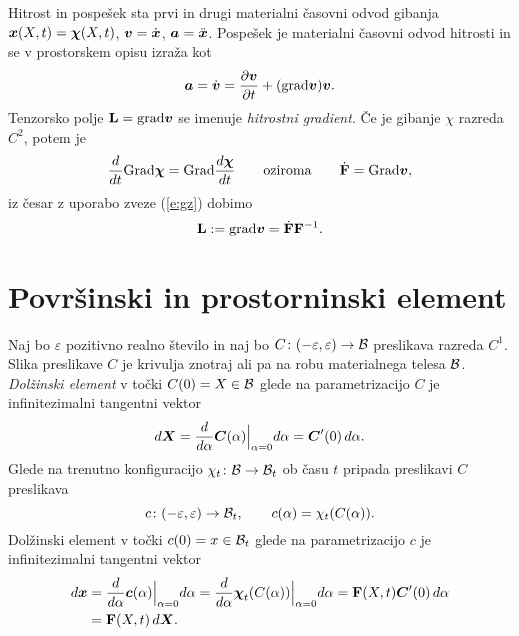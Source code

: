 \begin{primer} %
	Hitrost in pospešek sta prvi in drugi materialni časovni odvod gibanja $\boldsymbol x(X,t)=\boldsymbol \chi(X,t)$,
	$\boldsymbol v=\dot{\boldsymbol x}$, $\boldsymbol a=\ddot{\boldsymbol x}$.
	Pospešek je materialni časovni odvod hitrosti in se v prostorskem opisu izraža kot
	\[ \boldsymbol a=\dot{\boldsymbol v}=\frac{\partial\boldsymbol v}{\partial t}+(\mathrm{grad}\boldsymbol v)\boldsymbol v. \]
	Tenzorsko polje $\mathbf L=\mathrm{grad}\boldsymbol v$ se imenuje \emph{hitrostni gradient}.
	Če je gibanje $\chi$ razreda $C^2$, potem je
	\[
		\frac{d}{dt}\mathrm{Grad}\boldsymbol \chi=\mathrm{Grad}\frac{d\boldsymbol \chi}{dt}\qquad\textrm{oziroma}\qquad
		\dot{\mathbf F}=\mathrm{Grad}\boldsymbol v,
	\]
	iz česar z uporabo zveze (\ref{e:gz}) dobimo
	\begin{equation} \label{e:L}
		\mathbf L:=\mathrm{grad}\boldsymbol v=\dot{\mathbf F}\mathbf F^{-1}.
	\end{equation}
\end{primer}


\section{Površinski in prostorninski element}


Naj bo $\varepsilon$ pozitivno realno število in naj bo $C\colon(-\varepsilon,\varepsilon)\to\mathcal B$
preslikava razreda $C^1$. Slika preslikave $C$ je krivulja znotraj ali pa na robu
materialnega telesa $\mathcal B$. \emph{Dolžinski element} v točki $C(0)=X\in\mathcal B$ glede na parametrizacijo $C$
je infinitezimalni tangentni vektor
\[
	d\boldsymbol X=\frac{d}{d\alpha}\boldsymbol C(\alpha)\Big|_{\alpha=0}d\alpha=\boldsymbol C'(0)\, d\alpha.
\]
Glede na trenutno konfiguracijo $\chi_t\colon\mathcal B\to\mathcal B_t$ ob času $t$ pripada preslikavi $C$ preslikava
\[
	c\colon(-\varepsilon,\varepsilon)\to\mathcal B_t,\qquad c(\alpha)=\chi_t(C(\alpha)).
\]
Dolžinski element v točki $c(0)=x\in\mathcal B_t$ glede na parametrizacijo $c$ je infinitezimalni
tangentni vektor
\begin{align*}
	d\boldsymbol x&=\frac{d}{d\alpha}\boldsymbol c(\alpha)\Big|_{\alpha=0}d\alpha
	=\frac{d}{d\alpha}\boldsymbol \chi_t(C(\alpha))\Big|_{\alpha=0}d\alpha
	=\mathbf F(X,t)\boldsymbol C'(0)\,d\alpha \\
	&=\mathbf F(X,t)\,d\boldsymbol X.
\end{align*}

